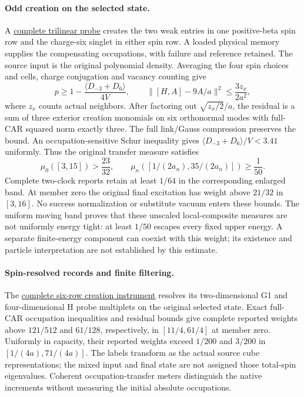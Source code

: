 \paragraph{Odd creation on the selected state.}
A \href{https://github.com/FloatingPragma/observer-patch-holography/blob/main/model/particle_primary_selected_odd_response/PROOF.md}{complete trilinear probe}
creates the two weak entries in one positive-beta spin row and the
charge-six singlet in either spin row. A loaded physical memory supplies
the compensating occupations, with failure and reference retained.
The source input is the original polynomial density. Averaging the four
spin choices and cells, charge conjugation and vacancy counting give
\[
 p\ge1-\frac{\langle D_{-3}+D_6\rangle}{4V},\qquad
 \|[H,A]-9A/a\|^2\le\frac{3z_x}{2a^2},
\]
where $z_x$ counts actual neighbors. After factoring out
$\sqrt{z_x/2}/a$, the residual is a sum of three exterior creation
monomials on six orthonormal modes with full-CAR squared norm exactly
three. The full link/Gauss compression preserves
the bound. An occupation-sensitive Schur inequality gives
$\langle D_{-3}+D_6\rangle/V<3.41$ uniformly. Thus the original transfer
measure satisfies
\[
 \mu_0([3,15])>\frac{23}{32},\qquad
 \mu_n([1/(2a_n),35/(2a_n)])\ge\frac1{50}.
\]
Complete two-clock reports retain at least $1/64$ in the corresponding
enlarged band. At member zero the original final excitation has weight
above $21/32$ in $[3,16]$. No success normalization or substitute vacuum
enters these bounds. The uniform moving band proves that these unscaled
local-composite measures are not uniformly energy tight: at least $1/50$
escapes every fixed upper energy. A separate finite-energy component can
coexist with this weight; its existence and particle interpretation are
not established by this estimate.

\paragraph{Spin-resolved records and finite filtering.}
The \href{https://github.com/FloatingPragma/observer-patch-holography/blob/main/model/particle_primary_selected_spin_response/PROOF.md}{complete six-row creation instrument}
resolves its two-dimensional G1 and four-dimensional H probe multiplets
on the original selected state. Exact full-CAR occupation inequalities
and residual bounds give complete reported weights above $121/512$ and
$61/128$, respectively, in $[11/4,61/4]$ at member zero. Uniformly in
capacity, their reported weights exceed $1/200$ and $3/200$ in
$[1/(4a),71/(4a)]$. The labels transform as the actual source cube
representations; the mixed input and final state are not assigned those
total-spin eigenvalues. Coherent occupation-transfer meters distinguish
the native increments without measuring the initial absolute occupations.

